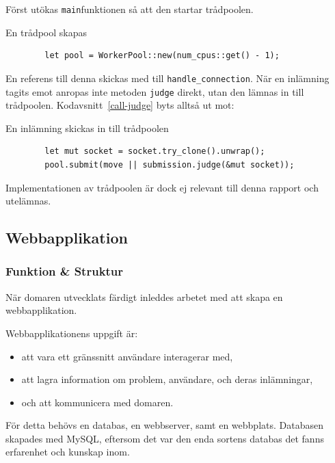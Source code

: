 \documentclass{article}
\renewcommand\listingscaption{Kodavsnitt}
\newcommand{\coderef}[1]{\listingscaption~\ref{#1}}
\begin{document}
Först utökas \texttt{main}funktionen så att den startar trådpoolen.

\begin{listing}[H]
	\caption{En trådpool skapas}
	\begin{verbatim}
		let pool = WorkerPool::new(num_cpus::get() - 1);
	\end{verbatim}
\end{listing}

En referens till denna skickas med till \texttt{handle\_connection}. När en
inlämning tagits emot anropas inte metoden \texttt{judge} direkt, utan den
lämnas in till trådpoolen. \coderef{call-judge} byts alltså ut mot:

\begin{listing}[H]
	\caption{En inlämning skickas in till trådpoolen}
	\begin{verbatim}
        let mut socket = socket.try_clone().unwrap();
        pool.submit(move || submission.judge(&mut socket));
	\end{verbatim}
\end{listing}

Implementationen av trådpoolen är dock ej relevant till denna rapport och
utelämnas.

\subsection{Webbapplikation}

\subsubsection{Funktion \& Struktur}

När domaren utvecklats färdigt inleddes arbetet med att skapa en
webbapplikation.

Webbapplikationens uppgift är:

\begin{itemize}
	\item att vara ett gränssnitt användare interagerar med,
	\item att lagra information om problem, användare, och deras inlämningar,
	\item och att kommunicera med domaren.
\end{itemize}

För detta behövs en databas, en webbserver, samt en webbplats. Databasen
skapades med MySQL, eftersom det var den enda sortens databas det fanns
erfarenhet och kunskap inom.
\end{document}
